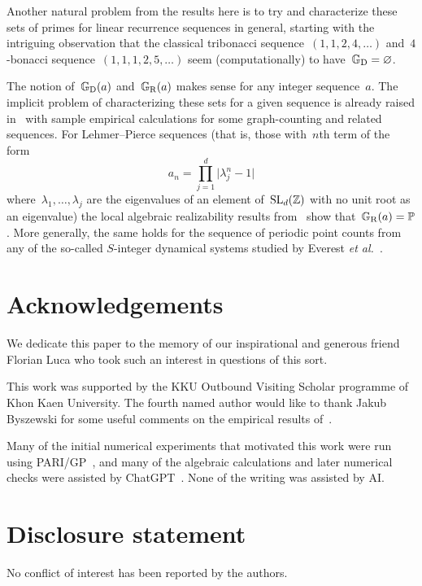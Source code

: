 \documentclass[]{interact}
\theoremstyle{plain}
\numberwithin{equation}{section} %
\numberwithin{table}{section} %
\numberwithin{figure}{section}
\def\PP{\mathbb{P}}
\def\ZZ{\mathbb{Z}}
\def\gooddoldprimes{\mathbb{G}_{\rm{D}}}
\def\goodrealizableprimes{\mathbb{G}_{\rm{R}}}
\begin{document}
Another natural problem from the results here is to try and
characterize these sets of primes for linear recurrence sequences
in general,
starting with the intriguing observation that the classical
tribonacci sequence~$(1,1,2,4,\dots)$
and~$4$-bonacci sequence~$(1,1,1,2,5,\dots)$ seem
(computationally) to have~$\gooddoldprimes=\varnothing$.

The notion of~$\gooddoldprimes(a)$ and~$\goodrealizableprimes(a)$
makes sense for any integer
sequence~$a$. The implicit problem of characterizing these
sets for a given sequence is already raised in~\cite{MR5076929}
with sample empirical calculations for some graph-counting
and related sequences.
For Lehmer--Pierce sequences (that is, those with~$n$th
term of the form
\[
a_n=\prod_{j=1}^{d}\vert\lambda_j^n-1\vert
\]
where~$\lambda_1,\dots,\lambda_j$
are the eigenvalues of an element of~${\rm{SL}}_d(\ZZ)$ with no
unit root as an eigenvalue) the local algebraic
realizability results from~\cite{MR5076929}
show that~$\goodrealizableprimes(a)=\PP$.
More generally, the same holds for the sequence of
periodic point counts from any of the so-called $S$-integer
dynamical systems studied by Everest {\it{et al.}}~\cite{MR1461206,MR2339472}.

\section*{Acknowledgements}
We dedicate this paper to the memory of our
inspirational and generous friend Florian Luca
who took such an interest in questions of this
sort.

This work was supported by the KKU Outbound
Visiting Scholar programme of Khon Kaen University.
The fourth named author would like to thank
Jakub Byszewski for some useful comments on the
empirical results of~\cite{MR5076929}.

Many of the initial numerical experiments that
motivated this work were run using PARI/GP~\cite{PARI2},
and many of the algebraic calculations and
later numerical checks were assisted by
ChatGPT~\cite{ChatGPT}. None of the writing was
assisted by AI.

\section*{Disclosure statement}
No conflict of interest has been reported by the authors.


\end{document}
